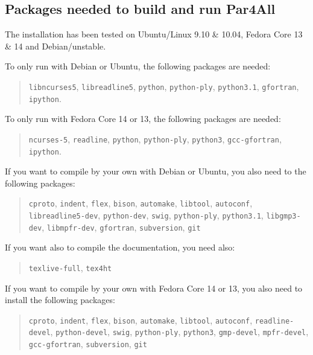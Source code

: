 \documentclass[a4paper]{article}
\begin{document}
\subsection{Packages needed to build and run Par4All}
\label{sec:pack-need-build}

The installation has been tested on Ubuntu/Linux 9.10 \& 10.04,
Fedora Core 13 \& 14 and Debian/unstable.

To only run \Apfa with Debian or Ubuntu, the following packages are needed:
\begin{quote}
  \texttt{libncurses5}, \texttt{libreadline5}, \texttt{python},
  \texttt{python-ply}, \texttt{python3.1}, \texttt{gfortran},
  \texttt{ipython}.
\end{quote}

To only run \Apfa with Fedora Core 14 or 13, the following packages are needed:
\begin{quote}
  \texttt{ncurses-5}, \texttt{readline}, \texttt{python},
  \texttt{python-ply}, \texttt{python3}, \texttt{gcc-gfortran},
  \texttt{ipython}.
\end{quote}


If you want to compile \Apfa by your own with Debian or Ubuntu, you also
need to the following packages:
\begin{quote}
  \texttt{cproto}, \texttt{indent}, \texttt{flex}, \texttt{bison},
  \texttt{automake}, \texttt{libtool}, \texttt{autoconf},
  \texttt{libreadline5-dev}, \texttt{python-dev}, \texttt{swig},
  \texttt{python-ply}, \texttt{python3.1}, \texttt{libgmp3-dev},
  \texttt{libmpfr-dev}, \texttt{gfortran}, \texttt{subversion},
  \texttt{git}
\end{quote}

If you want also to compile the documentation, you need also:
\begin{quote}
  \texttt{texlive-full}, \texttt{tex4ht}
\end{quote}

If you want to compile \Apfa by your own with Fedora Core 14 or 13, you also
need to install the following packages:
\begin{quote}
  \texttt{cproto}, \texttt{indent}, \texttt{flex}, \texttt{bison},
  \texttt{automake}, \texttt{libtool}, \texttt{autoconf},
  \texttt{readline-devel}, \texttt{python-devel}, \texttt{swig},
  \texttt{python-ply}, \texttt{python3}, \texttt{gmp-devel},
  \texttt{mpfr-devel}, \texttt{gcc-gfortran}, \texttt{subversion},
  \texttt{git}
\end{quote}
\end{document}
